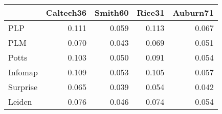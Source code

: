 \begin{tabular}{lrrrr}
\toprule
{} & Caltech36 & Smith60 & Rice31 & Auburn71 \\
\midrule
PLP      &     0.111 &   0.059 &  0.113 &    0.067 \\
PLM      &     0.070 &   0.043 &  0.069 &    0.051 \\
Potts    &     0.103 &   0.050 &  0.091 &    0.054 \\
Infomap  &     0.109 &   0.053 &  0.105 &    0.057 \\
Surprise &     0.065 &   0.039 &  0.054 &    0.042 \\
Leiden   &     0.076 &   0.046 &  0.074 &    0.054 \\
\bottomrule
\end{tabular}
